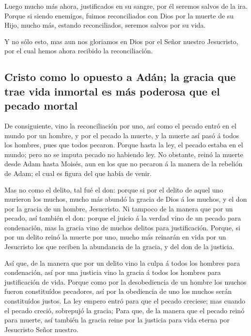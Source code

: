  Luego mucho más ahora, justificados en su sangre, por él
seremos salvos de la ira.  Porque si siendo enemigos,
fuimos reconciliados con Dios por la muerte de su Hijo, mucho más,
estando reconciliados, seremos salvos por su vida.

 Y no sólo esto, mas aun nos gloriamos en Dios por el Señor
nuestro Jesucristo, por el cual hemos ahora recibido la reconciliación.

\hypertarget{cristo-como-lo-opuesto-a-aduxe1n-la-gracia-que-trae-vida-inmortal-es-muxe1s-poderosa-que-el-pecado-mortal}{%
\subsection{Cristo como lo opuesto a Adán; la gracia que trae vida
inmortal es más poderosa que el pecado
mortal}\label{cristo-como-lo-opuesto-a-aduxe1n-la-gracia-que-trae-vida-inmortal-es-muxe1s-poderosa-que-el-pecado-mortal}}

 De consiguiente, vino la reconciliación por uno, así como
el pecado entró en el mundo por un hombre, y por el pecado la muerte, y
la muerte así pasó á todos los hombres, pues que todos pecaron.
 Porque hasta la ley, el pecado estaba en el mundo; pero no
se imputa pecado no habiendo ley.  No obstante, reinó la
muerte desde Adam hasta Moisés, aun en los que no pecaron á la manera de
la rebelión de Adam; el cual es figura del que había de venir.

 Mas no como el delito, tal fué el don: porque si por el
delito de aquel uno murieron los muchos, mucho más abundó la gracia de
Dios á los muchos, y el don por la gracia de un hombre, Jesucristo.
 Ni tampoco de la manera que por un pecado, así también el
don: porque el juicio á la verdad vino de un pecado para condenación,
mas la gracia vino de muchos delitos para justificación. 
Porque, si por un delito reinó la muerte por uno, mucho más reinarán en
vida por un Jesucristo los que reciben la abundancia de la gracia, y del
don de la justicia.

 Así que, de la manera que por un delito vino la culpa á
todos los hombres para condenación, así por una justicia vino la gracia
á todos los hombres para justificación de vida.  Porque
como por la desobediencia de un hombre los muchos fueron constituídos
pecadores, así por la obediencia de uno los muchos serán constituídos
justos.  La ley empero entró para que el pecado creciese;
mas cuando el pecado creció, sobrepujó la gracia;  Para
que, de la manera que el pecado reinó para muerte, así también la gracia
reine por la justicia para vida eterna por Jesucristo Señor nuestro.

